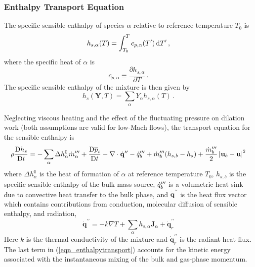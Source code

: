 \subsubsection{Enthalpy Transport Equation}
\label{enthalpy_definitions}

The specific sensible enthalpy of species $\alpha$ relative to reference temperature $T_0$ is
\begin{equation}
\label{eqn_sensible}
h_{s,\alpha}(T) = \int_{T_0}^{T} c_{p,\alpha}(T^\prime) \,\mathrm{d} T^\prime \,\mbox{,}
\end{equation}
where the specific heat of $\alpha$ is
\begin{equation}
\label{eqn_specificheat}
c_{p,\alpha} \equiv \frac{\partial h_{s,\alpha}}{\partial T} \,\mbox{.}
\end{equation}
The specific sensible enthalpy of the mixture is then given by
\begin{equation}
\label{eqn_chemsensmix}
h_s(\mathbf{Y},T) = \sum_\alpha Y_\alpha h_{s,\alpha}(T) \,\mbox{.}
\end{equation}

Neglecting viscous heating and the effect of the fluctuating pressure on dilation work (both assumptions are valid for low-Mach flows), the transport equation for the sensible enthalpy is
\begin{equation}
\label{eqn_enthalpytransport}
\rho \frac{\mbox{D} h_s }{\mbox{D} t} = -\sum_\alpha \Delta h^0_\alpha \dot{m}_{\alpha}^{{\prime\prime\prime}} + \frac{\mbox{D} \overline{p}_i }{\mbox{D} t} - \nabla\cdot \dot{\mathbf{q}}^{\prime\prime} - \dot{q}_b''' + \dot{m}_{b}^{{\prime\prime\prime}} ( h_{s,b} - h_s ) + \frac{\dot{m}_{b}^{{\prime\prime\prime}}}{2}\left|\mathbf{u}_b-\mathbf{u}\right|^2
\end{equation}
where $\Delta h^0_\alpha$ is the heat of formation of $\alpha$ at reference temperature $T_0$, $h_{s,b}$ is the specific sensible enthalpy of the bulk mass source, $\dot{q}_b^{{\prime\prime\prime}}$ is a volumetric heat sink due to convective heat transfer to the bulk phase, and $\dot{\mathbf{q}}^{\prime\prime}$ is the heat flux vector which contains contributions from conduction, molecular diffusion of sensible enthalpy, and radiation,
\begin{equation}
\label{eqn_heatflux}
\dot{\mathbf{q}}^{\prime\prime} = -k \nabla T + \sum_\alpha h_{s,\alpha} \mathbf{J}_{\alpha} + \dot{\mathbf{q}}^{\prime\prime}_{r}
\end{equation}
Here $k$ is the thermal conductivity of the mixture and $\dot{\mathbf{q}}^{\prime\prime}_{r}$ is the radiant heat flux.  The last term in (\ref{eqn_enthalpytransport}) accounts for the kinetic energy associated with the instantaneous mixing of the bulk and gas-phase momentum.


